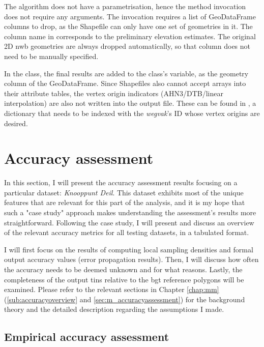 The algorithm does not have a parametrisation, hence the method invocation does not require any arguments. The  invocation requires a list of GeoDataFrame columns to drop, as the Shapefile can only have one set of geometries in it. The column name in  corresponds to the preliminary elevation estimates. The original 2D \ac{nwb} geometries are always dropped automatically, so that column does not need to be manually specified.

In the  class, the final results are added to the class's  variable, as the  geometry column of the GeoDataFrame. Since Shapefiles also cannot accept arrays into their attribute tables, the vertex origin indicators (AHN3/DTB/linear interpolation) are also not written into the output file. These can be found in , a dictionary that needs to be indexed with the \textit{wegvak}'s ID whose vertex origins are desired.

\section{Accuracy assessment}
\label{sec:accuracy}

In this section, I will present the accuracy assessment results focusing on a particular dataset: \textit{Knooppunt Deil}. This dataset exhibits most of the unique features that are relevant for this part of the analysis, and it is my hope that such a "case study" approach makes understanding the assessment's results more straightforward. Following the case study, I will present and discuss an overview of the relevant accuracy metrics for all testing datasets, in a tabulated format.

I will first focus on the results of computing local sampling densities and formal output accuracy values (error propagation results). Then, I will discuss how often the accuracy needs to be deemed unknown and for what reasons. Lastly, the completeness of the output \ac{tin}s relative to the \ac{bgt} reference polygons will be examined. Please refer to the relevant sections in Chapter \ref{chap:mm} (\ref{sub:accuracyoverview} and \ref{sec:m_accuracyassessment}) for the background theory and the detailed description regarding the assumptions I made.

\subsection{Empirical accuracy assessment}
\label{sub:accuracyempirical}

